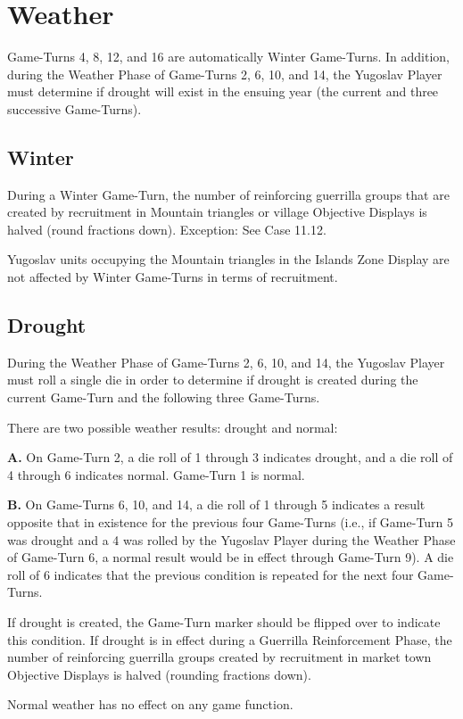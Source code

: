 \section{Weather}\label{sec:11.0}


\begin{generalrule}

Game-Turns 4, 8, 12, and 16 are automatically Winter Game-Turns. In addition, during the Weather Phase of Game-Turns 2, 6, 10, and 14, the Yugoslav Player must determine if drought will exist in the ensuing year (the current and three successive Game-Turns).

\end{generalrule}

\subsection{Winter}\label{sec:11.1}

 During a Winter Game-Turn, the number of reinforcing guerrilla groups that are created by recruitment in Mountain triangles or village Objective Displays is halved (round fractions down). Exception: See Case 11.12.

 Yugoslav units occupying the Mountain triangles in the Islands Zone Display are not affected by Winter Game-Turns in terms of recruitment.

\subsection{Drought}\label{sec:11.2}

 During the Weather Phase of Game-Turns 2, 6, 10, and 14, the Yugoslav Player must roll a single die in order to determine if drought is created during the current Game-Turn and the following three Game-Turns.

 There are two possible weather results: drought and normal:

\textbf{A.} On Game-Turn 2, a die roll of 1 through 3 indicates drought, and a die roll of 4 through 6 indicates normal. Game-Turn 1 is normal.

\textbf{B.} On Game-Turns 6, 10, and 14, a die roll of 1 through 5 indicates a result opposite that in existence for the previous four Game-Turns (i.e., if Game-Turn 5 was drought and a 4 was rolled by the Yugoslav Player during the Weather Phase of Game-Turn 6, a normal result would be in effect through Game-Turn 9). A die roll of 6 indicates that the previous condition is repeated for the next four Game-Turns.

 If drought is created, the Game-Turn marker should be flipped over
to indicate this condition. If drought is in effect during a Guerrilla
Reinforcement Phase, the number of reinforcing guerrilla groups created by
recruitment in market town Objective Displays is halved (rounding fractions
down).

 Normal weather has no effect on any game function.
